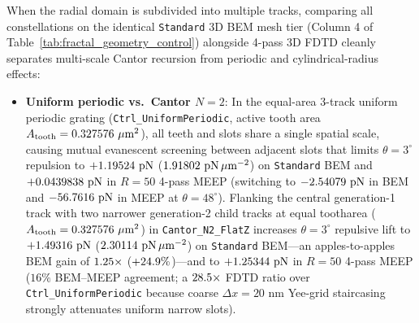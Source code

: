 \documentclass[11pt,letterpaper]{article}
\begin{document}
When the radial domain is subdivided into multiple tracks, comparing all constellations on the identical \texttt{Standard} 3D BEM mesh tier (Column 4 of Table~\ref{tab:fractal_geometry_control}) alongside 4-pass 3D FDTD cleanly separates multi-scale Cantor recursion from periodic and cylindrical-radius effects:
\begin{itemize}
    \item \textbf{Uniform periodic vs.\ Cantor $N=2$}: In the equal-area 3-track uniform periodic grating (\texttt{Ctrl\_UniformPeriodic}, active tooth area $A_{\rm tooth} = 0.327576{}\ \mu\text{m}^2$), all teeth and slots share a single spatial scale, causing mutual evanescent screening between adjacent slots that limits $\theta=3^\circ$ repulsion to $+1.19524{}\text{ pN}$ ($1.91802{}\text{ pN}\,\mu\text{m}^{-2}$) on \texttt{Standard} BEM and $+0.0439838{}\text{ pN}$ in $R=50$ 4-pass MEEP (switching to $-2.54079{}\text{ pN}$ in BEM and $-56.7616{}\text{ pN}$ in MEEP at $\theta=48^\circ$). Flanking the central generation-1 track with two narrower generation-2 child tracks at equal tootharea ($A_{\rm tooth} = 0.327576{}\ \mu\text{m}^2$) in \texttt{Cantor\_N2\_FlatZ} increases $\theta=3^\circ$ repulsive lift to $+1.49316{}\text{ pN}$ ($2.30114{}\text{ pN}\,\mu\text{m}^{-2}$) on \texttt{Standard} BEM---an apples-to-apples BEM gain of $1.25{}\times$ ($+24.9{}\%$)---and to $+1.25344{}\text{ pN}$ in $R=50$ 4-pass MEEP ($16\%$ BEM--MEEP agreement; a $28.5{}\times$ FDTD ratio over \texttt{Ctrl\_UniformPeriodic} because coarse $\Delta x = 20\text{ nm}$ Yee-grid staircasing strongly attenuates uniform narrow slots).

\end{itemize}
\end{document}
